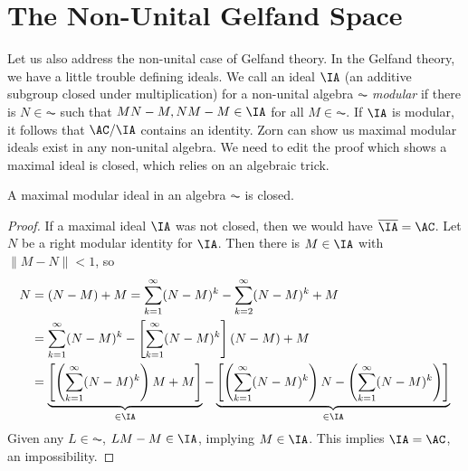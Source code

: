 \section{The Non-Unital Gelfand Space}

Let us also address the non-unital case of Gelfand theory. In the Gelfand theory, we have a little trouble defining ideals. We call an ideal $\IA$ (an additive subgroup closed under multiplication) for a non-unital algebra $\AC$ \emph{modular} if there is $N \in \AC$ such that $MN - M, NM - M \in \IA$ for all $M \in \AC$. If $\IA$ is modular, it follows that $\AC/\IA$ contains an identity. Zorn can show us maximal modular ideals exist in any non-unital algebra. We need to edit the proof which shows a maximal ideal is closed, which relies on an algebraic trick.

\begin{lemma}
    A maximal modular ideal in an algebra $\AC$ is closed.
\end{lemma}
\begin{proof}
    If a maximal ideal $\IA$ was not closed, then we would have $\overline{\IA} = \AC$. Let $N$ be a right modular identity for $\IA$. Then there is $M \in \IA$ with $\| M - N \| < 1$, so
    \begin{align*}
        N &= (N - M) + M = \sum_{k = 1}^\infty (N - M)^k - \sum_{k = 2}^\infty (N - M)^k + M\\
        &= \sum_{k = 1}^\infty (N - M)^k - \left[ \sum_{k = 1}^\infty (N - M)^k \right] (N - M) + M\\
        &= \underbrace{\left[ \left( \sum_{k = 1}^\infty (N - M)^k \right) M + M \right]}_{\in \IA} - \underbrace{\left[ \left( \sum_{k = 1}^\infty (N - M)^k \right) N - \left( \sum_{k = 1}^\infty (N - M)^k \right) \right]}_{\in \IA}
    \end{align*}
    Given any $L \in \AC$, $LM - M \in \IA$, implying $M \in \IA$. This implies $\IA = \AC$, an impossibility.
\end{proof}

